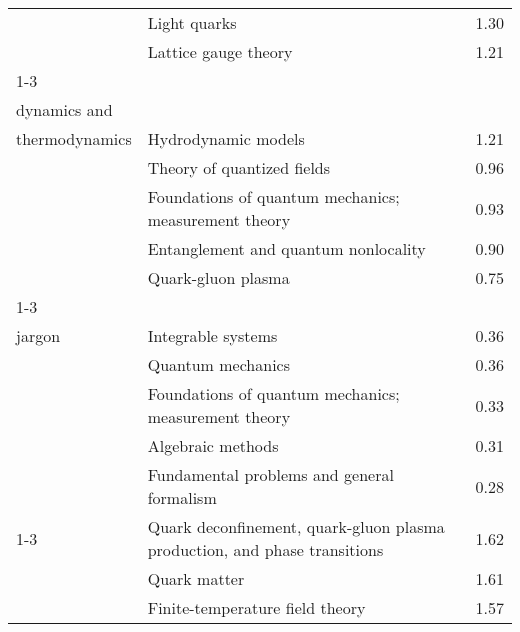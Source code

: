 \begin{longtable}[H]{p{}|p{}|p{}}
                                                               & Light quarks &  1.30 \\
                                                               & Lattice gauge theory &  1.21 \\
\cline{1-3}
\multirow{5}{*}{\begin{tabular}{l}Systems\\ dynamics and\\ thermodynamics\end{tabular}} & Hydrodynamic models &  1.21 \\
                                                               & Theory of quantized fields &  0.96 \\
                                                               & Foundations of quantum mechanics; measurement theory &  0.93 \\
                                                               & Entanglement and quantum nonlocality &  0.90 \\
                                                               & Quark-gluon plasma &  0.75 \\
\cline{1-3}
\multirow{5}{*}{\begin{tabular}{l}Theoretical\\ jargon\end{tabular}} & Integrable systems &  0.36 \\
                                                               & Quantum mechanics &  0.36 \\
                                                               & Foundations of quantum mechanics; measurement theory &  0.33 \\
                                                               & Algebraic methods &  0.31 \\
                                                               & Fundamental problems and general formalism &  0.28 \\
\cline{1-3}
\multirow{5}{*}{\begin{tabular}{l}Thermodynamics\end{tabular}} & Quark deconfinement, quark-gluon plasma production, and phase transitions &  1.62 \\
                                                               & Quark matter &  1.61 \\
                                                               & Finite-temperature field theory &  1.57 \\

\end{longtable}
